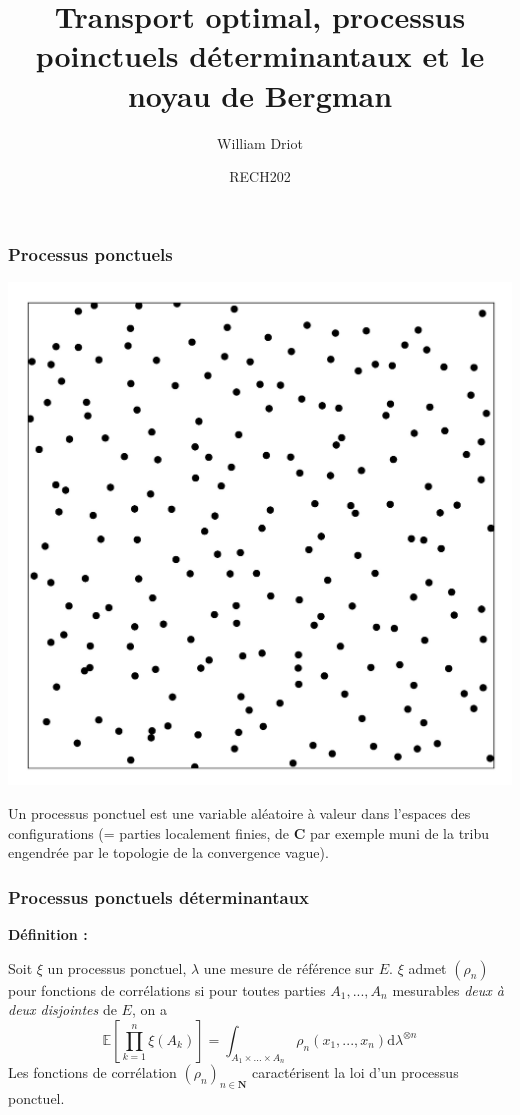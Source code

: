 \documentclass{beamer}
\title{Transport optimal, processus poinctuels déterminantaux et le noyau de Bergman}
\date{RECH202}
\author{William Driot}
\begin{document}
\begin{frame}

\titlepage

\end{frame}\begin{frame}\frametitle{Processus ponctuels}

    \begin{center}

    \includegraphics[scale=1]{Points trimmed.jpg}

    
    Un processus ponctuel est une variable aléatoire à valeur dans l'espaces des \og configurations \fg (= parties localement finies, de $ \mathbf C $ par exemple muni de la tribu engendrée par le topologie de la convergence vague).
    \end{center}

\end{frame}\begin{frame}\frametitle{Processus ponctuels déterminantaux}

    \textbf{Définition :}

    Soit $\xi $ un processus ponctuel, $ \lambda $ une mesure de référence sur $E$. $ \xi $  admet $(\rho_n) $ pour fonctions de corrélations si pour toutes parties $A_1,...,A_n$ mesurables \textit{deux à deux disjointes} de $E$, on a $$ \mathbb E \left[ \prod_{k=1}^n \xi(A_k) \right] = \int_{A_1\times ... \times A_n} \rho_n(x_1,...,x_n) \mathrm d \lambda^{\otimes n} $$ Les fonctions de corrélation $ (\rho_n)_{n \in \mathbf N}$ caractérisent la loi d'un processus ponctuel.


\end{frame}
\end{document}

